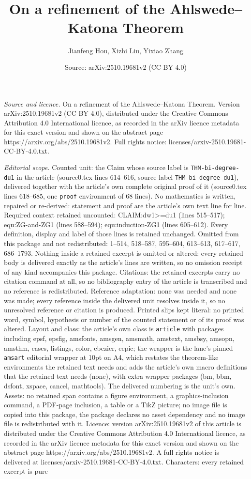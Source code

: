 \documentclass[10pt,a4paper]{amsart}
\title[On a refinement of the Ahlswede--Katona Theorem]{On a refinement of the Ahlswede--Katona Theorem}
\author{Jianfeng Hou, Xizhi Liu, Yixiao Zhang}
\date{Source: arXiv:2510.19681v2 (CC BY 4.0)}
\begin{document}
\maketitle

\noindent\emph{Source and licence.} On a refinement of the Ahlswede--Katona Theorem. Version arXiv:2510.19681v2 (CC BY 4.0), distributed under the Creative Commons Attribution 4.0 International licence, as recorded in the arXiv licence metadata for this exact version and shown on the abstract page https://arxiv.org/abs/2510.19681v2. Full rights notice: licenses/arxiv-2510.19681-CC-BY-4.0.txt.\par\smallskip

\noindent\textit{Editorial scope.} Counted unit: the Claim whose source label is \texttt{THM-bi-degree-du1} in the article (source0.tex lines 614--616, source label \texttt{THM-bi-degree-du1}), delivered together with the article's own complete original proof of it (source0.tex lines 618--685, one \texttt{proof} environment of 68 lines). No mathematics is written, repaired or re-derived: statement and proof are the article's own text line for line. Required context retained uncounted: CLAIM:dw1>=du1 (lines 515--517); equ:ZG-and-ZG1 (lines 588--594); equ:induction-ZG1 (lines 605--612). Every definition, display and label of those lines is retained unchanged. Omitted from this package and not redistributed: 1--514, 518--587, 595--604, 613--613, 617--617, 686--1793. Nothing inside a retained excerpt is omitted or altered: every retained body is delivered exactly as the article's lines are written, so no omission receipt of any kind accompanies this package. Citations: the retained excerpts carry no citation command at all, so no bibliography entry of the article is transcribed and no reference is redistributed. Reference adaptation: none was needed and none was made; every reference inside the delivered unit resolves inside it, so no unresolved reference or citation is produced. Printed slips kept literal: no printed word, symbol, hypothesis or number of the counted statement or of its proof was altered. Layout and class: the article's own class is \texttt{article} with packages including epsf, epsfig, amsfonts, amsgen, amsmath, amstext, amsbsy, amsopn, amsthm, cases, listings, color, ebezier, eepic; the wrapper is the lane's pinned \texttt{amsart} editorial wrapper at 10pt on A4, which restates the theorem-like environments the retained text needs and adds the article's own macro definitions that the retained text needs (none), with extra wrapper packages (bm, bbm, dsfont, xspace, cancel, mathtools). The delivered numbering is the unit's own. Assets: no retained span contains a figure environment, a graphics-inclusion command, a PDF-page inclusion, a table or a TikZ picture; no image file is copied into this package, the package declares no asset dependency and no image file is redistributed with it. Licence: version arXiv:2510.19681v2 of this article is distributed under the Creative Commons Attribution 4.0 International licence, as recorded in the arXiv licence metadata for this exact version and shown on the abstract page https://arxiv.org/abs/2510.19681v2. A full rights notice is delivered at licenses/arxiv-2510.19681-CC-BY-4.0.txt. Characters: every retained excerpt is pure 
\end{document}
